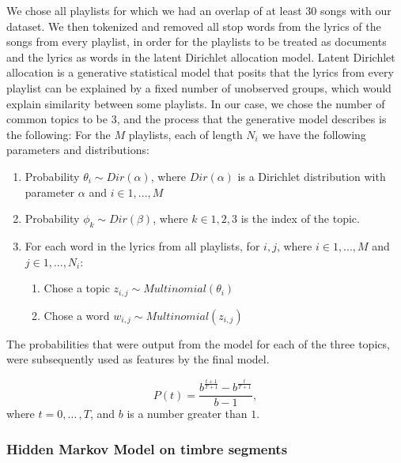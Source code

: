 \documentclass[acmtog]{acmart}
\begin{document}
We chose all playlists for which we had an overlap of at least 30 songs with our dataset. We then tokenized and removed all stop words from the lyrics of the songs from every playlist, in order for the playlists to be treated as documents and the lyrics as words in the latent Dirichlet allocation model. Latent Dirichlet allocation is a generative statistical model that posits that the lyrics from every playlist can be explained by a fixed number of unobserved groups, which would explain similarity between some playlists. In our case, we chose the number of common topics to be 3, and the process that the generative model describes is the following: \newline
For the $M$ playlists, each of length $N_{i}$ we have the following parameters and distributions:
\begin{enumerate}
  \item Probability $\theta_{i} \sim Dir(\alpha)$, where $Dir(\alpha)$ is a Dirichlet distribution with parameter $\alpha$ and $i \in {1, ..., M}$
  \item Probability $\phi_{k} \sim Dir(\beta)$, where $k \in {1,2,3}$ is the index of the topic.
  \item For each word in the lyrics from all playlists, for $i, j$, where $i \in {1, ..., M}$ and $j \in {1, ..., N_{i}}$:
     \begin{enumerate}
       \item Chose a topic $z_{i, j} \sim Multinomial(\theta_{i})$
       \item Chose a word $w_{i, j} \sim Multinomial(z_{i, j})$
     \end{enumerate}
\end{enumerate}

The probabilities that were output from the model for each of the three topics, were subsequently used as features by the final model.

\begin{equation}
\label{eqn:01}
P(t)=\frac{b^{\frac{t+1}{T+1}}-b^{\frac{t}{T+1}}}{b-1},
\end{equation}
where $t=0,{\ldots}\,,T$, and $b$ is a number greater than $1$.

\subsubsection{Hidden Markov Model on timbre segments}
\end{document}
